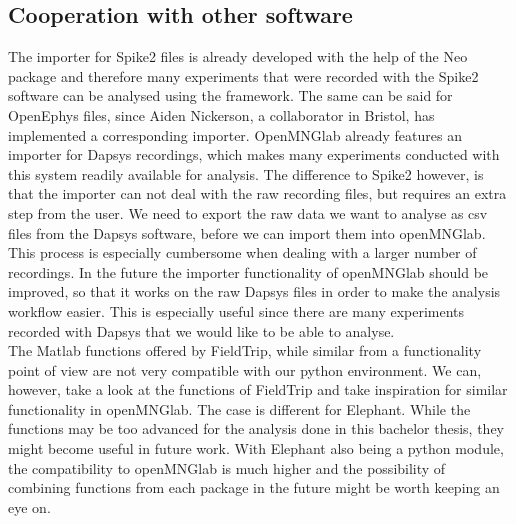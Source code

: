 \subsection{Cooperation with other software}
The importer for Spike2 files is already developed with the help of the Neo package and therefore many experiments that were recorded with the Spike2 software can be analysed using the framework. The same can be said for OpenEphys files, since Aiden Nickerson, a collaborator in Bristol, has implemented a corresponding importer.
OpenMNGlab already features an importer for Dapsys recordings, which makes many experiments conducted with this system readily available for analysis.
The difference to Spike2 however, is that the importer can not deal with the raw recording files, but requires an extra step from the user. We need to export the raw data we want to analyse as csv files from the Dapsys software, before we can import them into openMNGlab. This process is especially cumbersome when dealing with a larger number of recordings. In the future the importer functionality of openMNGlab should be improved, so that it works on the raw Dapsys files in order to make the analysis workflow easier. This is especially useful since there are many experiments recorded with Dapsys that we would like to be able to analyse.\\

The Matlab functions offered by FieldTrip, while similar from a functionality point of view are not very compatible with our python environment. We can, however, take a look at the functions of FieldTrip and take inspiration for similar functionality in openMNGlab.
The case is different for Elephant. While the functions may be too advanced for the analysis done in this bachelor thesis, they might become useful in future work.  With Elephant also being a python module, the compatibility to openMNGlab is much higher and the possibility of combining functions from each package in the future might be worth keeping an eye on. 

 
\cleardoublepage
